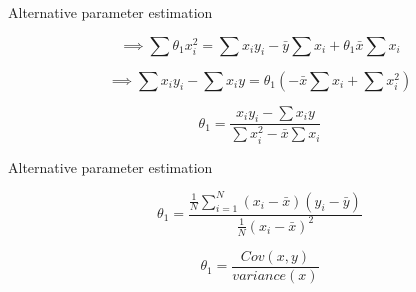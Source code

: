 \documentclass{beamer}
\begin{document}
\begin{frame}{Alternative parameter estimation}

$$
\implies \sum  \theta_{1}x_{i}^{2} = \sum x_{i}y_{i} - \bar{y}\sum x_{i} + \theta_{1}\bar{x}\sum x_{i} 
$$

$$
\implies \sum  
x_{i}y_{i} - \sum x_{i}y = \theta_{1} (-\bar{x}\sum x_{i} + \sum x_{i}^{2})
$$

$$
\theta_{1} = \frac{x_{i}y_{i} - \sum x_{i}y}{\sum x_{i}^{2} -\bar{x}\sum x_{i}}
$$

    
\end{frame}

\begin{frame}{Alternative parameter estimation}
    
    $$
    \theta_{1} = \frac{ \frac{1}{N} \sum_{i=1}^{N}(x_{i} - \bar{x})(y_{i} - \bar{y})}{\frac{1}{N}(x_{i} - \bar{x})^{2}}
    $$
    
    \begin{tcolorbox}
    
    $$
    \theta_{1} = \frac{Cov(x,y)}{variance(x)}
    $$
    \end{tcolorbox}
\end{frame}
        




    






    

\end{document}
